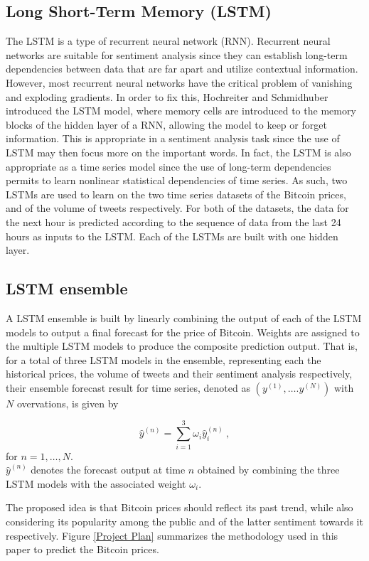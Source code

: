 \documentclass[conference]{IEEEtran}
\begin{document}
\subsection{Long Short-Term Memory (LSTM)}
\par The LSTM is a type of recurrent neural network (RNN). Recurrent neural networks are suitable for sentiment analysis since they can establish long-term dependencies between data that are far apart and utilize contextual information. However, most recurrent neural networks have the critical problem of vanishing and exploding gradients. In order to fix this, Hochreiter and Schmidhuber \cite{LSTM} introduced the LSTM model, where memory cells are introduced to the memory blocks of the hidden layer of a RNN, allowing the model to keep or forget information. This is appropriate in a sentiment analysis task since the use of LSTM may then focus more on the important words. In fact, the LSTM is also appropriate as a time series model since the use of long-term dependencies permits to learn nonlinear statistical dependencies of time series. As such, two LSTMs are used to learn on the two time series datasets of the Bitcoin prices, and of the volume of tweets respectively. For both of the datasets, the data for the next hour is predicted according to the sequence of data from the last 24 hours as inputs to the LSTM. Each of the LSTMs are built with one hidden layer.

\subsection{LSTM ensemble}
\par A LSTM ensemble is built by linearly combining the output of each of the LSTM models to output a final forecast for the price of Bitcoin. Weights are assigned to the multiple LSTM models to produce the composite prediction output. That is, for a total of three LSTM models in the ensemble, representing each the historical prices, the volume of tweets and their sentiment analysis respectively, their ensemble forecast result for time series, denoted as $(y^{(1)}, \dots. y^{(N)})$ with $N$ overvations, is given by 

\begin{equation}
\label{LSTM ensemble weights}
\hat{y}^{(n)} = \sum_{i = 1}^{3} \omega_{i} \hat{y}_{i}^{(n)} ~, 
\end{equation} 
for $n = 1, \dots, N$.\\
$\hat{y}^{(n)}$ denotes the forecast output at time $n$ obtained by combining the three LSTM models with the associated weight $\omega_{i}$.
\par The proposed idea is that Bitcoin prices should reflect its past trend, while also considering its popularity among the public and of the latter sentiment towards it respectively. Figure \ref{Project Plan} summarizes the methodology used in this paper to predict the Bitcoin prices.
\end{document}

